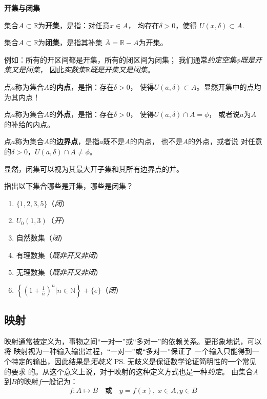 \begin{shaded}
	{\bf 开集与闭集}
	
	集合$A\subset\mathbb{R}$为{\bf 开集}，是指：对任意$x\in A$，
	均存在$\delta>0$，使得
	$U(x,\delta)\subset A.$
	
	集合$A\subset\mathbb{R}$为{\bf 闭集}，是指其补集
	$\bar{A}=\mathbb{R}-A$为开集。
	
	例如：所有的开区间都是开集，所有的闭区间为闭集；
	我们通常{\it 约定空集$\phi$既是开集又是闭集}，
	因此{\it 实数集$\mathbb{R}$既是开集又是闭集}。
	
	点$a$称为集合$A$的{\bf 内点}，是指：存在$\delta>0$，
	使得$U(a,\delta)\subset A$。显然开集中的点均为其内点！
	
	点$a$称为集合$A$的{\bf 外点}，是指：存在$\delta>0$，
	使得$U(a,\delta)\cap A=\phi$，
	或者说$a$为$A$的补给的内点。
	
	点$a$称为集合$A$的{\bf 边界点}，是指$a$既不是$A$的内点，
	也不是$A$的外点，或者说
	对任意的$\delta>0$，$U(a,\delta)\cap A\ne\phi$。
	
	显然，闭集可以视为其最大开子集和其所有边界点的并。
	
	\bs

	\egz 指出以下集合哪些是开集，哪些是闭集？
	\begin{enumerate}[(1)]
	  \setlength{\itemindent}{1cm}
	  \item $\{1,2,3,5\}$\hfill（{\it 闭}）
	  \item $U_0(1,3)$\hfill（{\it 开}）
	  \item 自然数集\hfill（{\it 闭}）
	  \item 有理数集\hfill（{\it 既非开又非闭}）
	  \item 无理数集\hfill（{\it 既非开又非闭}）
	  \item $\left\{\left(1+\frac
	  1n\right)^n|n\in\mathbb{N}\right\}+\{e\}$\hfill（{\it 闭}）
	\end{enumerate}
\end{shaded}

\subsection{映射}

映射通常被定义为，事物之间“一对一”或“多对一”的依赖关系。更形象地说，可以将
映射视为一种输入输出过程，“一对一”或“多对一”保证了
一个输入只能得到一个特定的输出，因此结果是{\it 无歧义}
\ps{无歧义是保证数学论证简明性的一个常见的要求}
的。从这个意义上说，对于映射的这种定义方式也是一种{\it 约定}。
由集合$A$到$B$的映射$f$一般记为：
$$f:A\mapsto B \quad\mbox{或}\quad y=f(x),\;x\in A,y\in B$$

